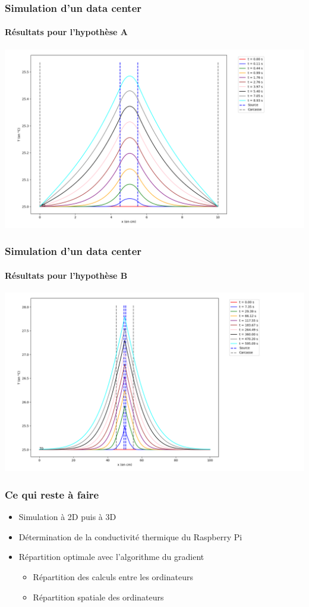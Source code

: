\documentclass[a4paper,11pt]{beamer}
\begin{document}
\begin{frame}
    \frametitle{Simulation d'un data center}
    \framesubtitle{Résultats pour l'hypothèse A}

    \includegraphics[width=\textwidth]{hypA_C1.67.png}
\end{frame}

\begin{frame}
    \frametitle{Simulation d'un data center}
    \framesubtitle{Résultats pour l'hypothèse B}

    \includegraphics[width=\textwidth]{hypB_C1.67.png}
\end{frame}

\begin{frame}
    \frametitle{Ce qui reste à faire}

    \begin{itemize}
        \item Simulation à 2D puis à 3D
        \item Détermination de la conductivité thermique du Raspberry Pi
        \item Répartition optimale avec l'algorithme du gradient
        \begin{itemize}
            \item Répartition des calculs entre les ordinateurs
            \item Répartition spatiale des ordinateurs
        \end{itemize}
    \end{itemize}
\end{frame}
\end{document}
